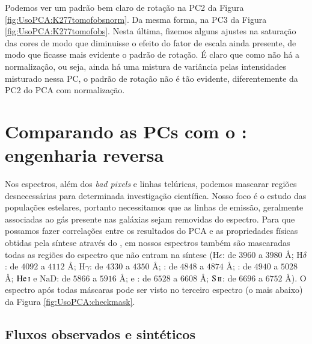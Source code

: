 Podemos ver um padrão bem claro de rotação na PC2 da Figura \ref{fig:UsoPCA:K277tomofobsnorm}. Da mesma forma, na PC3 da
Figura \ref{fig:UsoPCA:K277tomofobs}. Nesta última, fizemos alguns ajustes na saturação das cores de modo que diminuisse
o efeito do fator de escala ainda presente, de modo que ficasse mais evidente o padrão de rotação. É claro que como não
há a normalização, ou seja, ainda há uma mistura de variância pelas intensidades misturado nessa PC, o padrão de rotação
não é tão evidente, diferentemente da PC2 do PCA com normalização.

\section{Comparando as PCs com o \STARLIGHT: engenharia reversa}
\label{sec:UsoPCA:EngRev}

Nos espectros, além dos {\em bad pixels} e linhas telúricas, podemos mascarar regiões desnecessárias para determinada
investigação científica. Nosso foco é o estudo das populações estelares, portanto necessitamos que as linhas de emissão,
geralmente associadas ao gás presente nas galáxias \fixme sejam removidas do espectro. Para que possamos fazer
correlações entre os resultados do PCA e as propriedades físicas obtidas pela síntese através do \starlight, em nossos
espectros também são mascaradas todas as regiões do espectro que não entram na síntese ($\mathrm{H}\epsilon$: de $3960$
a $3980$ \AA; $\mathrm{H}\delta$: de $4092$ a $4112$ \AA; $\mathrm{H}\gamma$: de $4330$ a $4350$ \AA; \Hbeta: de $4848$
a $4874$ \AA; \oIII: de $4940$ a $5028$ \AA; $\mathrm{He\,\textsc{i}}$ e $\mathrm{NaD}$: de $5866$ a $5916$ \AA; \Halpha
e \nII: de $6528$ a $6608$ \AA; $\mathrm{S\,\textsc{ii}}$: de $6696$ a $6752$ \AA). O espectro após todas máscaras pode
ser visto no terceiro espectro (o mais abaixo) da Figura \ref{fig:UsoPCA:checkmask}.

\subsection{Fluxos observados e sintéticos}

